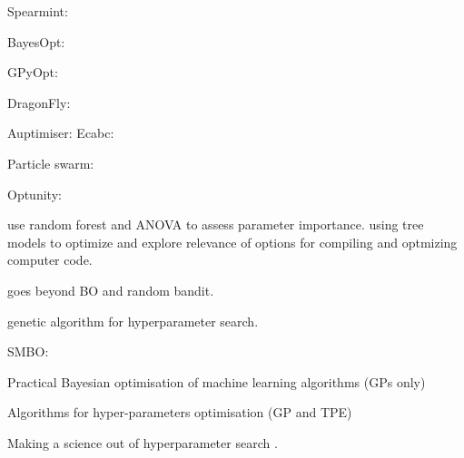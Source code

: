 Spearmint: \cite{DBLP:conf/uai/GelbartSA14}\cite{snoekAbstractBayesianOptimization2013}\cite{snoekInputWarpingBayesian2014a}\cite{NIPS2013_5086}\cite{NIPS2012_4522}

BayesOpt: \cite{martinez-cantinBayesOptBayesianOptimization2014}

GPyOpt: \cite{gpyopt2016}

DragonFly: \cite{JMLR:v21:18-223}

Auptimiser: \cite{liuAuptimizerExtensibleOpenSource2019}
Ecabc: \cite{Sharma2019}

Particle swarm: \cite{lorenzo2017particle}

Optunity: \cite{claesenEasyHyperparameterSearch2014}

\cite{pmlr-v32-hutter14} use random forest and ANOVA to assess parameter importance. 
\cite{gramacyVariableSelectionSensitivity2013} using tree models to optimize and explore relevance of options for compiling and optmizing computer code. 

\cite{falknerBOHBRobustEfficient2018a} goes beyond BO and random bandit. 

\cite{di2018genetic} genetic algorithm for hyperparameter search. 

SMBO: \cite{hutterSequentialModelbasedOptimization2011}

Practical Bayesian optimisation of machine learning algorithms \cite{NIPS2012_4522} (GPs only)

Algorithms for hyper-parameters optimisation \cite{bergstraAlgorithmsHyperParameterOptimizationa} (GP and TPE)

Making a science out of hyperparameter search \cite{bergstraMakingScienceModel2013}. 




















